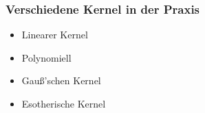 	
	\begin{frame}
		\frametitle{Verschiedene Kernel in der Praxis}
			\begin{itemize}
				\item Linearer Kernel \\
				\item Polynomiell \\
				\item Gauß'schen Kernel \\
				\item Esotherische Kernel \\
			\end{itemize}
	\end{frame}

